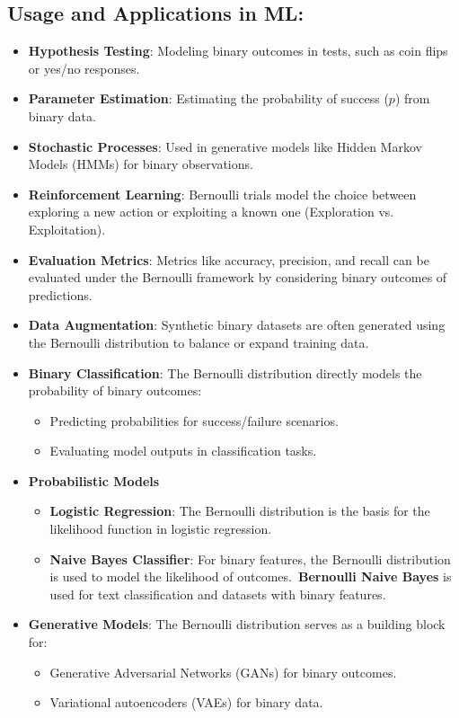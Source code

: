 \subsection*{Usage and Applications in ML:}
\begin{itemize}
    \item \textbf{Hypothesis Testing}: Modeling binary outcomes in tests, such as coin flips or yes/no responses.
    \item \textbf{Parameter Estimation}: Estimating the probability of success ($p$) from binary data.
    \item \textbf{Stochastic Processes}: Used in generative models like Hidden Markov Models (HMMs) for binary observations.
    \item \textbf{Reinforcement Learning}: Bernoulli trials model the choice between exploring a new action or exploiting a known one (Exploration vs. Exploitation).
    \item \textbf{Evaluation Metrics}: Metrics like accuracy, precision, and recall can be evaluated under the Bernoulli framework by considering binary outcomes of predictions.
    \item \textbf{Data Augmentation}: Synthetic binary datasets are often generated using the Bernoulli distribution to balance or expand training data.
    \item \textbf{Binary Classification}: The Bernoulli distribution directly models the probability of binary outcomes:
    \begin{itemize}
        \item Predicting probabilities for success/failure scenarios.
        \item Evaluating model outputs in classification tasks.
    \end{itemize}
    \item \textbf{Probabilistic Models}
    \begin{itemize}
        \item \textbf{Logistic Regression}: The Bernoulli distribution is the basis for the likelihood function in logistic regression.
        \item \textbf{Naive Bayes Classifier}: For binary features, the Bernoulli distribution is used to model the likelihood of outcomes.\ \textbf{Bernoulli Naive Bayes} is used for text classification and datasets with binary features.
    \end{itemize}
    \item \textbf{Generative Models}: The Bernoulli distribution serves as a building block for:
    \begin{itemize}
        \item Generative Adversarial Networks (GANs) for binary outcomes.
        \item Variational autoencoders (VAEs) for binary data.
    \end{itemize}
\end{itemize}

